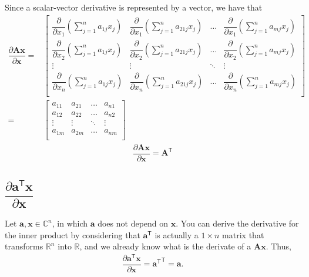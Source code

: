 \documentclass{article}
\newcommand{\trans}{\mathsf{T}}
\begin{document}
Since a scalar-vector derivative is represented by a vector, we have that
\begin{align}
    \dfrac{\partial \mathbf{A} \mathbf{x}}{\partial \mathbf{x}} = & \begin{bmatrix}
        \dfrac{\partial}{\partial x_1} \left( \sum_{j = 1}^n a_{1j}x_j \right) & 
        \dfrac{\partial}{\partial x_1} \left( \sum_{j = 1}^n a_{21j}x_j \right) & 
        \dots & 
        \dfrac{\partial}{\partial x_1} \left( \sum_{j = 1}^n a_{mj}x_j \right) \\
        \dfrac{\partial}{\partial x_2} \left( \sum_{j = 1}^n a_{1j}x_j \right) & 
        \dfrac{\partial}{\partial x_2} \left( \sum_{j = 1}^n a_{21j}x_j \right) & 
        \dots & 
        \dfrac{\partial}{\partial x_2} \left( \sum_{j = 1}^n a_{mj}x_j \right) \\
        \vdots & \vdots & \ddots & \vdots \\
        \dfrac{\partial}{\partial x_n} \left( \sum_{j = 1}^n a_{1j}x_j \right) & 
        \dfrac{\partial}{\partial x_n} \left( \sum_{j = 1}^n a_{21j}x_j \right) & 
        \dots & 
        \dfrac{\partial}{\partial x_n} \left( \sum_{j = 1}^n a_{mj}x_j \right) \\
    \end{bmatrix}  \\
    = & \begin{bmatrix}
        a_{11} & a_{21} & \dots & a_{n1} \\
        a_{12} & a_{22} & \dots & a_{n2} \\
        \vdots & \vdots & \ddots & \vdots \\
        a_{1m} & a_{2m} & \dots & a_{nm} \\
    \end{bmatrix}
\end{align}
\begin{align}
    \boxed{\dfrac{\partial \mathbf{A} \mathbf{x}}{\partial \mathbf{x}} = \mathbf{A}^\trans}
\end{align}

\subsection{\(\dfrac{\partial \mathbf{a}^\trans  \mathbf{x}}{\partial \mathbf{x}}\)}

Let \(\mathbf{a, x} \in \mathbb{C}^{n}\), in which \(\mathbf{a}\) does not depend on \(\mathbf{x}\). You can derive the derivative for the inner product by considering that \(\mathbf{a}^\trans\) is actually a \(1\times n\) matrix that transforms \(\mathbb{R}^{n}\) into \(\mathbb{R}\), and we already know what is the derivate of a \(\mathbf{Ax}\). Thus,
\begin{align}
    \dfrac{\partial \mathbf{a}^\trans \mathbf{x}}{\partial \mathbf{x}} = {\mathbf{a}^\trans}^\trans = \mathbf{a}.
\end{align}
\end{document}
